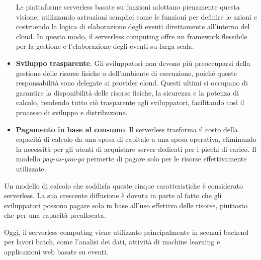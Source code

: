 \begin{itemize}
    Le piattaforme serverless basate su funzioni adottano pienamente questa visione, utilizzando astrazioni semplici come le funzioni per definire le azioni e costruendo la logica di elaborazione degli eventi direttamente all'interno del cloud. In questo modo, il serverless computing offre un framework flessibile per la gestione e l’elaborazione degli eventi su larga scala.
    \item \textbf{Sviluppo trasparente}. Gli sviluppatori non devono più preoccuparsi della gestione delle risorse fisiche o dell'ambiente di esecuzione, poiché queste responsabilità sono delegate ai provider cloud. Questi ultimi si occupano di garantire la disponibilità delle risorse fisiche, la sicurezza e la potenza di calcolo, rendendo tutto ciò trasparente agli sviluppatori, facilitando così il processo di sviluppo e distribuzione.
    \item \textbf{Pagamento in base al consumo}. Il serverless trasforma il costo della capacità di calcolo da una spesa di capitale a una spesa operativa, eliminando la necessità per gli utenti di acquistare server dedicati per i picchi di carico. Il modello \textit{pay-as-you-go} permette di pagare solo per le risorse effettivamente utilizzate.
\end{itemize}

Un modello di calcolo che soddisfa queste cinque caratteristiche è considerato serverless. La sua crescente diffusione è dovuta in parte al fatto che gli sviluppatori possono pagare solo in base all'uso effettivo delle risorse, piuttosto che per una capacità preallocata.

Oggi, il serverless computing viene utilizzato principalmente in scenari backend per lavori batch, come l'analisi dei dati, attività di machine learning e applicazioni web basate su eventi.
